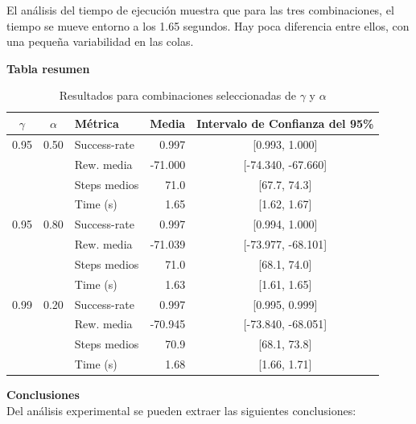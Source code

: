 El análisis del tiempo de ejecución muestra que para las tres combinaciones, el tiempo se mueve entorno a los 1.65 segundos. Hay poca diferencia entre ellos, con una pequeña variabilidad en las colas. 
\\

\newpage

\textbf{Tabla resumen}

\begin{table}[H]
    \centering
    \begin{tabular}{|c|c|l|r|c|}
    \hline
    $\gamma$ & $\alpha$ & Métrica        & Media    & Intervalo de Confianza del 95\% \\
    \hline
    0.95 & 0.50 & Success-rate  & 0.997   & [0.993, 1.000] \\
         &      & Rew. media    & -71.000 & [-74.340, -67.660] \\
         &      & Steps medios  & 71.0    & [67.7, 74.3] \\
         &      & Time (s)      & 1.65    & [1.62, 1.67] \\
    \hline
    0.95 & 0.80 & Success-rate  & 0.997   & [0.994, 1.000] \\
         &      & Rew. media    & -71.039 & [-73.977, -68.101] \\
         &      & Steps medios  & 71.0    & [68.1, 74.0] \\
         &      & Time (s)      & 1.63    & [1.61, 1.65] \\
    \hline
    0.99 & 0.20 & Success-rate  & 0.997   & [0.995, 0.999] \\
         &      & Rew. media    & -70.945 & [-73.840, -68.051] \\
         &      & Steps medios  & 70.9    & [68.1, 73.8] \\
         &      & Time (s)      & 1.68    & [1.66, 1.71] \\
    \hline
    \end{tabular}
    \caption{Resultados para combinaciones seleccionadas de $\gamma$ y $\alpha$}
    \label{tab:resultados_seleccionados}
    \end{table}

\textbf{Conclusiones}
\\

Del análisis experimental se pueden extraer las siguientes conclusiones:

